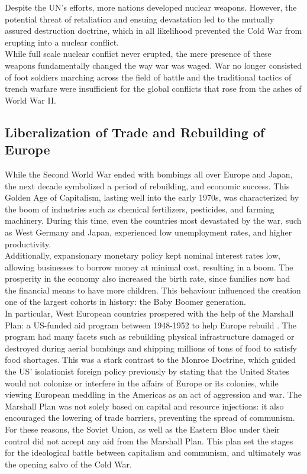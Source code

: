 \documentclass[12pt]{article}
\begin{document}
Despite the UN's efforts, more nations developed nuclear weapons. However, the potential threat of retaliation and ensuing devastation led to the mutually assured destruction doctrine, which in all likelihood prevented the Cold War from erupting into a nuclear conflict.\\

While full scale nuclear conflict never erupted, the mere presence of these weapons fundamentally changed the way war was waged. War no longer consisted of foot soldiers marching across the field of battle and the traditional tactics of trench warfare were insufficient for the global conflicts that rose from the ashes of World War II.

\subsection{Liberalization of Trade and Rebuilding of Europe}

While the Second World War ended with bombings all over Europe and Japan, the next decade symbolized a period of rebuilding, and economic success. This Golden Age of Capitalism, lasting well into the early 1970s, was characterized by the boom of industries such as chemical fertilizers, pesticides, and farming machinery\cite{9}. During this time, even the countries most devastated by the war, such as West Germany and Japan, experienced low unemployment rates, and higher productivity\cite{10}.\\

Additionally, expansionary monetary policy kept nominal interest rates low, allowing businesses to borrow money at minimal cost, resulting in a boom\cite{10}. The prosperity in the economy also increased the birth rate, since families now had the financial means to have more children. This behaviour influenced the creation one of the largest cohorts in history: the Baby Boomer generation\cite{10}.\\

In particular, West European countries prospered with the help of the Marshall Plan: a US-funded aid program between 1948-1952 to help Europe rebuild \cite{11}. The program had many facets such as rebuilding physical infrastructure damaged or destroyed during aerial bombings and shipping millions of tons of food to satisfy food shortages. This was a stark contrast to the Monroe Doctrine, which guided the US' isolationist foreign policy previously by stating that the United States would not colonize or interfere in the affairs of Europe or its colonies, while viewing European meddling in the Americas as an act of aggression and war\cite{12}. The Marshall Plan was not solely based on capital and resource injections: it also encouraged the lowering of trade barriers, preventing the spread of communism\cite{11}. For these reasons, the Soviet Union, as well as the Eastern Bloc under their control did not accept any aid from the Marshall Plan\cite{11}. This plan set the stages for the ideological battle between capitalism and communism, and ultimately was the opening salvo of the Cold War.
\end{document}
